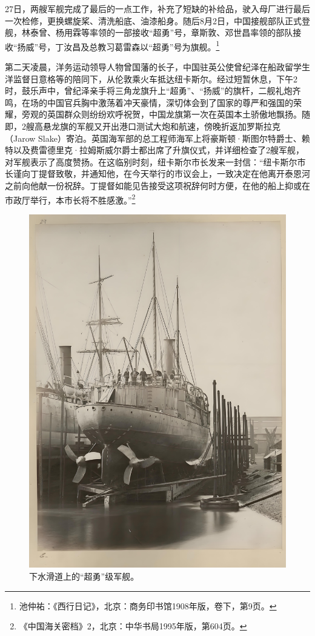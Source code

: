 \documentclass[12pt,UTF8]{ctexbook}
\begin{document}
27日，两艘军舰完成了最后的一点工作，补充了短缺的补给品，驶入母厂进行最后一次检修，更换螺旋桨、清洗船底、油漆船身。随后8月2日，中国接舰部队正式登舰，林泰曾、杨用霖等率领的一部接收“超勇”号，章斯敦、邓世昌率领的部队接收“扬威”号，丁汝昌及总教习葛雷森以“超勇”号为旗舰。\footnote{池仲祐：《西行日记》，北京：商务印书馆1908年版，卷下，第9页。}

第二天凌晨，洋务运动领导人物曾国藩的长子，中国驻英公使曾纪泽在船政留学生洋监督日意格等的陪同下，从伦敦乘火车抵达纽卡斯尔。经过短暂休息，下午2时，鼓乐声中，曾纪泽亲手将三角龙旗升上“超勇”、“扬威”的旗杆，二舰礼炮齐鸣，在场的中国官兵胸中激荡着冲天豪情，深切体会到了国家的尊严和强国的荣耀，旁观的英国群众则纷纷欢呼祝贺，中国龙旗第一次在英国本土骄傲地飘扬。随即，2艘高悬龙旗的军舰又开出港口测试大炮和航速，傍晚折返加罗斯拉克（Jarow Slake）寄泊。英国海军部的总工程师海军上将豪斯顿·斯图尔特爵士、赖特以及费雷德里克·拉姆斯威尔爵士都出席了升旗仪式，并详细检查了2艘军舰，对军舰表示了高度赞扬。在这临别时刻，纽卡斯尔市长发来一封信：“纽卡斯尔市长谨向丁提督致敬，并通知他，在今天举行的市议会上，一致决定在他离开泰恩河之前向他献一份祝辞。丁提督如能见告接受这项祝辞何时方便，在他的船上抑或在市政厅举行，本市长将不胜感激。”\footnote{《中国海关密档》2，北京：中华书局1995年版，第604页。}

\begin{figure}[htbp]
	\centering
	\includegraphics[width=1\linewidth]{Images/34}
	\caption{下水滑道上的“超勇”级军舰。}
	\label{fig:1}
\end{figure}
\end{document}
